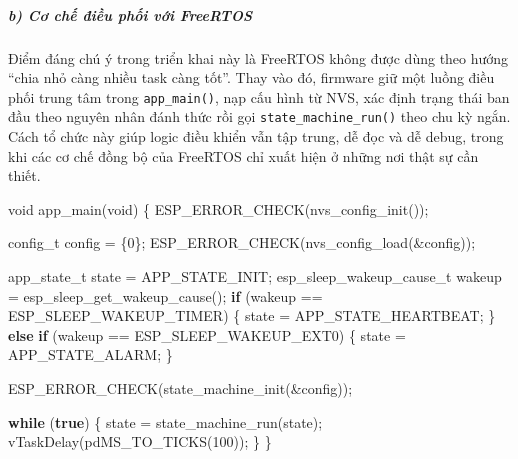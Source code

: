 \documentclass[a4paper]{extarticle}
\newenvironment{Shaded}{}{}
\newcommand{\ControlFlowTok}[1]{\textcolor[rgb]{0.00,0.44,0.13}{\textbf{#1}}}
\newcommand{\DataTypeTok}[1]{\textcolor[rgb]{0.56,0.13,0.00}{#1}}
\newcommand{\DecValTok}[1]{\textcolor[rgb]{0.25,0.63,0.44}{#1}}
\newcommand{\KeywordTok}[1]{\textcolor[rgb]{0.00,0.44,0.13}{\textbf{#1}}}
\newcommand{\NormalTok}[1]{#1}
\newcommand{\OperatorTok}[1]{\textcolor[rgb]{0.40,0.40,0.40}{#1}}
\begin{document}
\subparagraph{b) Cơ chế điều phối với
FreeRTOS}\label{b-cux1a1-chux1ebf-ux111iux1ec1u-phux1ed1i-vux1edbi-freertos}

Điểm đáng chú ý trong triển khai này là FreeRTOS không được dùng theo
hướng ``chia nhỏ càng nhiều task càng tốt''. Thay vào đó, firmware giữ
một luồng điều phối trung tâm trong \texttt{app\_main()}, nạp cấu hình từ
NVS, xác định trạng thái ban đầu theo nguyên nhân đánh thức rồi gọi
\texttt{state\_machine\_run()} theo chu kỳ ngắn. Cách tổ chức này giúp
logic điều khiển vẫn tập trung, dễ đọc và dễ debug, trong khi các cơ
chế đồng bộ của FreeRTOS chỉ xuất hiện ở những nơi thật sự cần thiết.

\begin{Shaded}
\begin{Highlighting}[]
\DataTypeTok{void}\NormalTok{ app\_main}\OperatorTok{(}\DataTypeTok{void}\OperatorTok{)} \OperatorTok{\{}
\NormalTok{    ESP\_ERROR\_CHECK}\OperatorTok{(}\NormalTok{nvs\_config\_init}\OperatorTok{());}

\NormalTok{    config\_t config }\OperatorTok{=} \OperatorTok{\{}\DecValTok{0}\OperatorTok{\};}
\NormalTok{    ESP\_ERROR\_CHECK}\OperatorTok{(}\NormalTok{nvs\_config\_load}\OperatorTok{(\&}\NormalTok{config}\OperatorTok{));}

\NormalTok{    app\_state\_t state }\OperatorTok{=}\NormalTok{ APP\_STATE\_INIT}\OperatorTok{;}
\NormalTok{    esp\_sleep\_wakeup\_cause\_t wakeup }\OperatorTok{=}\NormalTok{ esp\_sleep\_get\_wakeup\_cause}\OperatorTok{();}
    \ControlFlowTok{if} \OperatorTok{(}\NormalTok{wakeup }\OperatorTok{==}\NormalTok{ ESP\_SLEEP\_WAKEUP\_TIMER}\OperatorTok{)} \OperatorTok{\{}
\NormalTok{        state }\OperatorTok{=}\NormalTok{ APP\_STATE\_HEARTBEAT}\OperatorTok{;}
    \OperatorTok{\}} \ControlFlowTok{else} \ControlFlowTok{if} \OperatorTok{(}\NormalTok{wakeup }\OperatorTok{==}\NormalTok{ ESP\_SLEEP\_WAKEUP\_EXT0}\OperatorTok{)} \OperatorTok{\{}
\NormalTok{        state }\OperatorTok{=}\NormalTok{ APP\_STATE\_ALARM}\OperatorTok{;}
    \OperatorTok{\}}

\NormalTok{    ESP\_ERROR\_CHECK}\OperatorTok{(}\NormalTok{state\_machine\_init}\OperatorTok{(\&}\NormalTok{config}\OperatorTok{));}

    \ControlFlowTok{while} \OperatorTok{(}\KeywordTok{true}\OperatorTok{)} \OperatorTok{\{}
\NormalTok{        state }\OperatorTok{=}\NormalTok{ state\_machine\_run}\OperatorTok{(}\NormalTok{state}\OperatorTok{);}
\NormalTok{        vTaskDelay}\OperatorTok{(}\NormalTok{pdMS\_TO\_TICKS}\OperatorTok{(}\DecValTok{100}\OperatorTok{));}
    \OperatorTok{\}}
\OperatorTok{\}}
\end{Highlighting}
\end{Shaded}
\end{document}

